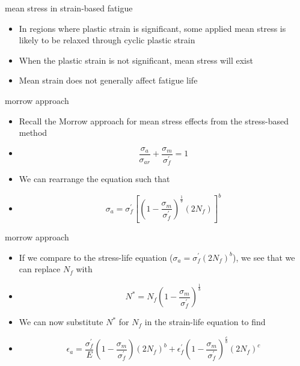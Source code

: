 \documentclass[10pt]{beamer}
\begin{document}
\begin{frame}{mean stress in strain-based fatigue}
	\begin{itemize}[<+->]
		\item In regions where plastic strain is significant, some applied mean stress is likely to be relaxed through cyclic plastic strain
		\item When the plastic strain is not significant, mean stress will exist
		\item Mean strain does not generally affect fatigue life
	\end{itemize}
\end{frame}

\begin{frame}{morrow approach}
	\begin{itemize}[<+->]
		\item Recall the Morrow approach for mean stress effects from the stress-based method
		\item[]\begin{equation}
		\frac{\sigma_a}{\sigma_{ar}} + \frac{\sigma_m}{\sigma_f^\prime} = 1
		\end{equation}
		\item We can rearrange the equation such that
		\item[]\begin{equation}
		\sigma_a = \sigma_f^\prime\left[\left(1-\frac{\sigma_m}{\sigma_f^\prime}\right)^\frac{1}{b}(2N_f)\right]^b
		\end{equation}
	\end{itemize}
\end{frame}

\begin{frame}{morrow approach}
	\begin{itemize}[<+->]
		\item If we compare to the stress-life equation ($\sigma_a = \sigma_f^\prime(2N_f)^b$), we see that we can replace $N_f$ with
		\item[] \begin{equation}
		\label{eq:nstar}
		N^* = N_f \left(1-\frac{\sigma_m}{\sigma_f^\prime}\right)^\frac{1}{b}
		\end{equation}
		\item We can now substitute $N^*$ for $N_f$ in the strain-life equation to find
		\item[] \begin{equation}
		\epsilon_a = \frac{\sigma_f^\prime}{E} \left(1-\frac{\sigma_m}{\sigma_f^\prime}\right)(2N_f)^b + \epsilon_f^\prime\left(1-\frac{\sigma_m}{\sigma_f^\prime}\right)^\frac{c}{b} (2 N_f)^c
		\end{equation}
	\end{itemize}
\end{frame}
\end{document}
